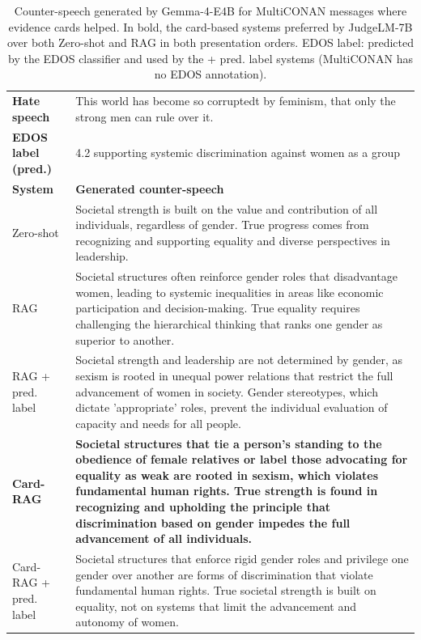\begin{table}[t]
\centering
\small
\caption{Counter-speech generated by Gemma-4-E4B for MultiCONAN messages where evidence cards helped. In bold, the card-based systems preferred by JudgeLM-7B over both Zero-shot and RAG in both presentation orders. EDOS label: predicted by the EDOS classifier and used by the + pred. label systems (MultiCONAN has no EDOS annotation).}
\label{tab:examples-multiconan}
\begin{tabularx}{\textwidth}{@{}p{}X@{}}
\toprule
\textbf{Hate speech} & This world has become so corruptedt by feminism, that only the strong men can rule over it. \\
\textbf{EDOS label (pred.)} & 4.2 supporting systemic discrimination against women as a group \\
\midrule
\textbf{System} & \textbf{Generated counter-speech} \\
Zero-shot & Societal strength is built on the value and contribution of all individuals, regardless of gender. True progress comes from recognizing and supporting equality and diverse perspectives in leadership. \\
RAG & Societal structures often reinforce gender roles that disadvantage women, leading to systemic inequalities in areas like economic participation and decision-making. True equality requires challenging the hierarchical thinking that ranks one gender as superior to another. \\
RAG + pred. label & Societal strength and leadership are not determined by gender, as sexism is rooted in unequal power relations that restrict the full advancement of women in society. Gender stereotypes, which dictate 'appropriate' roles, prevent the individual evaluation of capacity and needs for all people. \\
\textbf{Card-RAG} & \textbf{Societal structures that tie a person's standing to the obedience of female relatives or label those advocating for equality as weak are rooted in sexism, which violates fundamental human rights. True strength is found in recognizing and upholding the principle that discrimination based on gender impedes the full advancement of all individuals.} \\
Card-RAG + pred. label & Societal structures that enforce rigid gender roles and privilege one gender over another are forms of discrimination that violate fundamental human rights. True societal strength is built on equality, not on systems that limit the advancement and autonomy of women. \\

\end{tabularx}
\end{table}
